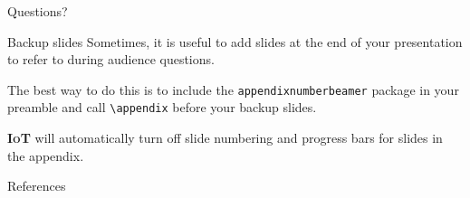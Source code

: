 \documentclass[10pt]{beamer}
\newcommand{\themename}{\textbf{\textsc{IoT}}\xspace}
\begin{document}
\begin{frame}[standout]
  Questions?
\end{frame}

\appendix

\begin{frame}[fragile]{Backup slides}
  Sometimes, it is useful to add slides at the end of your presentation to
  refer to during audience questions.

  The best way to do this is to include the \verb|appendixnumberbeamer|
  package in your preamble and call \verb|\appendix| before your backup slides.

  \themename will automatically turn off slide numbering and progress bars for
  slides in the appendix.
\end{frame}

\begin{frame}[allowframebreaks]{References}

  
  

\end{frame}
\end{document}
